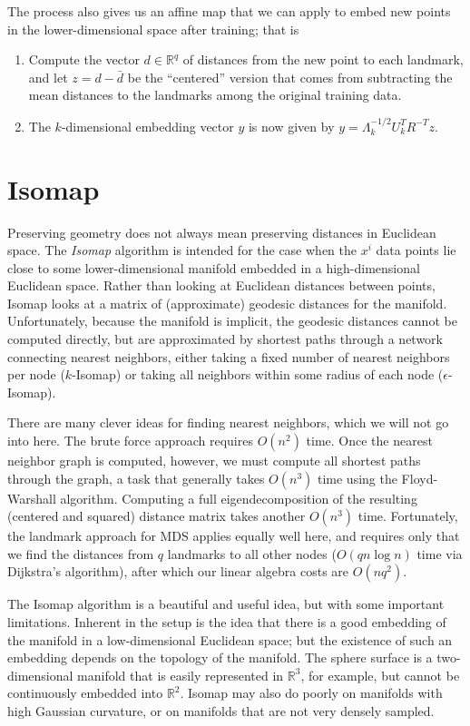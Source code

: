 \documentclass[12pt, leqno]{article} %
\begin{document}
The process also gives us an affine map that we can apply to embed new
points in the lower-dimensional space after training; that is
\begin{enumerate}
\item Compute the vector $d \in \mathbb{R}^q$ of distances from the
  new point to each landmark, and let $z = d-\bar{d}$ be the
  ``centered'' version that comes from subtracting the mean distances
  to the landmarks among the original training data.
\item The $k$-dimensional embedding vector $y$ is now given by
  $y = \Lambda_k^{-1/2} U_k^T R^{-T} z$.
\end{enumerate}

\section{Isomap}

Preserving geometry does not always mean preserving distances in
Euclidean space.  The {\em Isomap} algorithm is intended for the case
when the $x^i$ data points lie close to some lower-dimensional
manifold embedded in a high-dimensional Euclidean space.  Rather than
looking at Euclidean distances between points, Isomap looks at a
matrix of (approximate) geodesic distances for the manifold.
Unfortunately, because the manifold is implicit, the geodesic
distances cannot be computed directly, but are approximated by
shortest paths through a network connecting nearest neighbors, either
taking a fixed number of nearest neighbors per node ($k$-Isomap) or
taking all neighbors within some radius of each node
($\epsilon$-Isomap).

There are many clever ideas for finding nearest neighbors, which we
will not go into here.  The brute force approach requires $O(n^2)$
time.  Once the nearest neighbor graph is computed, however, we must
compute all shortest paths through the graph, a task that generally
takes $O(n^3)$ time using the Floyd-Warshall algorithm.  Computing a
full eigendecomposition of the resulting (centered and squared)
distance matrix takes another $O(n^3)$ time.  Fortunately, the
landmark approach for MDS applies equally well here, and requires only
that we find the distances from $q$ landmarks to all other nodes ($O(q
n \log n)$ time via Dijkstra's algorithm), after which our linear
algebra costs are $O(n q^2)$.

The Isomap algorithm is a beautiful and useful idea, but with some
important limitations.  Inherent in the setup is the idea that there
is a good embedding of the manifold in a low-dimensional Euclidean
space; but the existence of such an embedding depends on the topology
of the manifold.  The sphere surface is a two-dimensional manifold
that is easily represented in $\mathbb{R}^3$, for example, but cannot
be continuously embedded into $\mathbb{R}^2$.  Isomap may also do
poorly on manifolds with high Gaussian curvature, or on manifolds that
are not very densely sampled.
\end{document}
